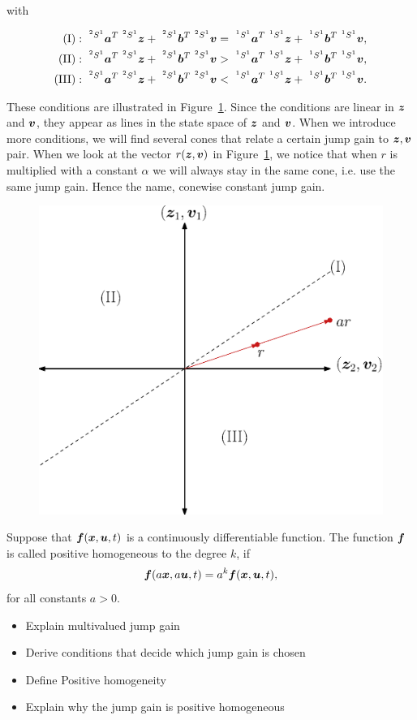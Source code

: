 \documentclass[../DC2017114Bouma.tex]{subfiles}
\begin{document}
with

\begin{align}
(\text{I})&:\ ^{^2 S^1}\ab^T\ ^{^2 S^1}\zb +\  ^{^2 S^1}\bb^T\ ^{^2 S^1}\vb = \ ^{^1 S^1}\ab^T\ ^{^1 S^1}\zb +\  ^{^1 S^1}\bb^T\ ^{^1 S^1}\vb,\\
(\text{II})&:\ ^{^2 S^1}\ab^T\ ^{^2 S^1}\zb +\  ^{^2 S^1}\bb^T\ ^{^2 S^1}\vb > \ ^{^1 S^1}\ab^T\ ^{^1 S^1}\zb +\  ^{^1 S^1}\bb^T\ ^{^1 S^1}\vb,\\
(\text{III})&:\ ^{^2 S^1}\ab^T\ ^{^2 S^1}\zb +\  ^{^2 S^1}\bb^T\ ^{^2 S^1}\vb < \ ^{^1 S^1}\ab^T\ ^{^1 S^1}\zb +\  ^{^1 S^1}\bb^T\ ^{^1 S^1}\vb .
\end{align}

These conditions are illustrated in Figure~\ref{fig:4cone}. Since the conditions are linear in ${\boldsymbol{z}}$ and ${\boldsymbol{v}}$, they appear as lines in the state space of ${\boldsymbol{z}}$ and ${\boldsymbol{v}}$. When we introduce more conditions, we will find several cones that relate a certain jump gain to ${\boldsymbol{z}},{\boldsymbol{v}}$ pair. When we look at the vector $r({\boldsymbol{z}},{\boldsymbol{v}})$ in Figure~\ref{fig:4cone}, we notice that when $r$ is multiplied with a constant $\alpha$ we will always stay in the same cone, i.e. use the same jump gain. Hence the name, conewise constant jump gain.

\begin{figure}[H]
\centering
\includegraphics[width=.5\textwidth]{4cone.eps}\caption{}\label{fig:4cone}
\end{figure}

\begin{mydef}
Suppose that ${\boldsymbol{f}}({\boldsymbol{x}},{\boldsymbol{u}},t)$ is a continuously differentiable function. The function ${\boldsymbol{f}}$ is called positive homogeneous to the degree $k$, if 
\begin{align}
{\boldsymbol{f}}(a{\boldsymbol{x}},a{\boldsymbol{u}},t) = a^k{\boldsymbol{f}}({\boldsymbol{x}},{\boldsymbol{u}},t),
\end{align}
for all constants $a>0$.
\end{mydef}

\begin{itemize}
\item Explain multivalued jump gain
\item Derive conditions that decide which jump gain is chosen
\item Define Positive homogeneity
\item Explain why the jump gain is positive homogeneous
\end{itemize}
\end{document}
